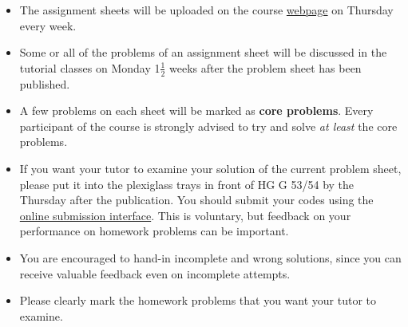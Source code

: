 \documentclass[12pt]{report}
\begin{document}
\begin{itemize}
\item The assignment sheets will be uploaded on the course
  \href{http://www2.math.ethz.ch/education/bachelor/lectures/hs2015/math/nummath_cse/index}{webpage}
  on Thursday every week.
\item Some or all of the problems of an assignment sheet will be discussed in the
  tutorial classes on Monday 1$\frac{1}{2}$ weeks after the problem sheet has been
  published.
\item A few problems on each sheet will be marked as {\bf core problems}. 
  Every participant of the course is strongly advised to try and solve \emph{at least}
  the core problems. 
\item If you want your tutor to examine your solution of the current problem
  sheet, please put it into the plexiglass trays in front of HG G 53/54 by the
  Thursday after the publication. You should submit your codes using the
  \href{https://people.math.ethz.ch/~grsam/submit/}{online submission
    interface}. This is voluntary, but feedback on your performance on homework
  problems can be important.
\item You are encouraged to hand-in incomplete and wrong solutions, since 
  you can receive valuable feedback even on incomplete attempts.
\item Please clearly mark the homework problems that you want your tutor to
  examine.
\end{itemize}


%
%





% 
% 
% 
% 
% 
% 
% 


 

\end{document}
